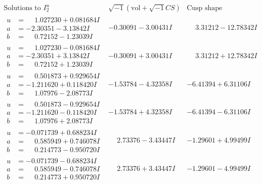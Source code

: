 \documentclass[1p]{elsarticle_modified}
\theoremstyle{definition}
\newcommand{\I}{\sqrt{-1}}
\begin{document}
$$\begin{array}{c|c|c}  
\text{Solutions to }I^u_{2}& \I (\text{vol} + \sqrt{-1}CS) & \text{Cusp shape}\\
 \hline 
\begin{aligned}
u &= \phantom{-}1.027230 + 0.081684 I \\
a &= -2.30351 - 3.13842 I \\
b &= \phantom{-}0.72152 - 1.23039 I\end{aligned}
 & -0.30091 - 3.00431 I & \phantom{-}3.31212 - 12.78342 I \\ \hline\begin{aligned}
u &= \phantom{-}1.027230 - 0.081684 I \\
a &= -2.30351 + 3.13842 I \\
b &= \phantom{-}0.72152 + 1.23039 I\end{aligned}
 & -0.30091 + 3.00431 I & \phantom{-}3.31212 + 12.78342 I \\ \hline\begin{aligned}
u &= \phantom{-}0.501873 + 0.929654 I \\
a &= -1.211620 + 0.118420 I \\
b &= \phantom{-}1.07976 - 2.08773 I\end{aligned}
 & -1.53784 - 4.32358 I & -6.41394 + 6.31106 I \\ \hline\begin{aligned}
u &= \phantom{-}0.501873 - 0.929654 I \\
a &= -1.211620 - 0.118420 I \\
b &= \phantom{-}1.07976 + 2.08773 I\end{aligned}
 & -1.53784 + 4.32358 I & -6.41394 - 6.31106 I \\ \hline\begin{aligned}
u &= -0.071739 + 0.688234 I \\
a &= \phantom{-}0.585949 + 0.746078 I \\
b &= \phantom{-}0.214773 - 0.950720 I\end{aligned}
 & \phantom{-}2.73376 - 3.43447 I & -1.29601 + 4.99499 I \\ \hline\begin{aligned}
u &= -0.071739 - 0.688234 I \\
a &= \phantom{-}0.585949 - 0.746078 I \\
b &= \phantom{-}0.214773 + 0.950720 I\end{aligned}
 & \phantom{-}2.73376 + 3.43447 I & -1.29601 - 4.99499 I \\ \hline\begin{aligned}

\end{aligned}
\end{array}$$
\end{document}
